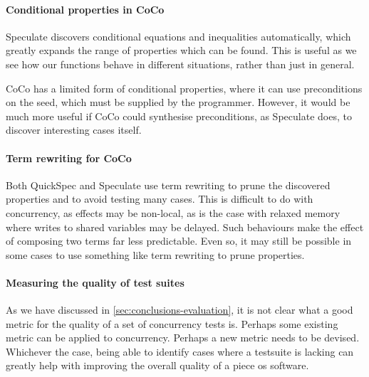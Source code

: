 \paragraph{Conditional properties in CoCo}
Speculate\cite{braquehais2017} discovers conditional equations and
inequalities automatically, which greatly expands the range of
properties which can be found.  This is useful as we see how our
functions behave in different situations, rather than just in general.

CoCo has a limited form of conditional properties, where it can use
preconditions on the seed, which must be supplied by the programmer.
However, it would be much more useful if CoCo could synthesise
preconditions, as Speculate does, to discover interesting cases
itself.

\paragraph{Term rewriting for CoCo}
Both QuickSpec\cite{smallbone2017} and Speculate\cite{braquehais2017}
use term rewriting to prune the discovered properties and to avoid
testing many cases.  This is difficult to do with concurrency, as
effects may be non-local, as is the case with relaxed
memory\cite{zhang2015} where writes to shared variables may be
delayed.  Such behaviours make the effect of composing two terms far
less predictable.  Even so, it may still be possible in some cases to
use something like term rewriting to prune properties.

\paragraph{Measuring the quality of test suites}
As we have discussed in \cref{sec:conclusions-evaluation}, it is not
clear what a good metric for the quality of a set of concurrency tests
is.  Perhaps some existing metric can be applied to concurrency.
Perhaps a new metric needs to be devised.  Whichever the case, being
able to identify cases where a testsuite is lacking can greatly help
with improving the overall quality of a piece os software.
